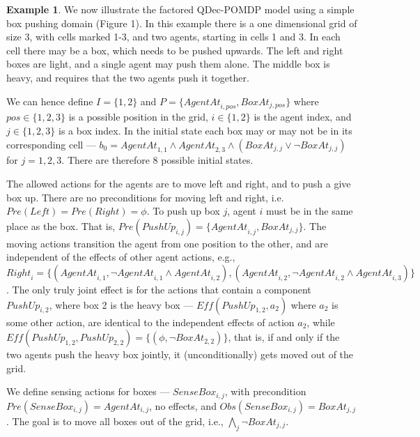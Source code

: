 \documentclass[letterpaper]{article}
\theoremstyle{definition}
\newtheorem{example}{Example}
\begin{document}
\begin{example}
\label{ex:BoxPushing}
We now illustrate the factored QDec-POMDP model using a simple box pushing domain (Figure 1).%
In this example there is a one dimensional grid of size 3, with cells marked 1-3, and two agents, starting in cells 1 and 3. In each cell there may be a box, which needs to be pushed upwards. The left and right boxes are light, and a single agent may push them alone. The middle box is heavy, and requires that the two agents push it together.

We can hence define $I=\{1,2\}$ and $P=\{\mathit{AgentAt}_{i,pos},\mathit{BoxAt}_{j,pos}\}$ where $pos \in \{1,2,3\}$ is a possible position in the grid, $i \in \{1,2\}$ is the agent index, and $j \in \{1,2,3\}$ is a box index. In the initial state each box may or may not be in its corresponding cell --- $b_0=\mathit{AgentAt}_{1,1} \wedge \mathit{AgentAt}_{2,3} \wedge (BoxAt_{j,j} \vee \neg BoxAt_{j,j})$ for $j=1,2,3$. There are therefore 8 possible initial states.

The allowed actions for the agents are to move left and right, and to push a give box up. There are no preconditions for moving left and right, i.e. $\mathit{Pre(Left)}=\mathit{Pre(Right)}=\phi$. To push up box $j$, agent $i$ must be in the same place as the box. That is, $\mathit{Pre(PushUp_{i,j})}=\{\mathit{AgentAt}_{i,j},\mathit{BoxAt}_{j,j}\}$. The moving actions transition the agent from one position to the other, and are independent of the effects of other agent actions, e.g., $\mathit{Right}_{i}=\{(\mathit{AgentAt}_{i,1},\neg \mathit{AgentAt}_{i,1} \wedge \mathit{AgentAt}_{i,2}),(\mathit{AgentAt}_{i,2},\neg \mathit{AgentAt}_{i,2} \wedge \mathit{AgentAt}_{i,3})\}$. The only truly joint effect is for the actions that contain a component $\mathit{PushUp}_{i,2}$, where box 2 is the heavy box --- $\mathit{Eff}(\mathit{PushUp}_{1,2},a_2)$ where $a_2$ is some other action, are identical to the independent effects of action $a_2$, while $\mathit{Eff}(\mathit{PushUp}_{1,2},\mathit{PushUp}_{2,2})=\{(\phi,\neg BoxAt_{2,2})\}$, that is, if and only if the two agents push the heavy box jointly, it (unconditionally) gets moved out of the grid.

We define sensing actions for boxes --- $\mathit{SenseBox_{i,j}}$, with precondition $\mathit{Pre(SenseBox_{i,j})}=AgentAt_{i,j}$, no effects, and $\mathit{Obs(SenseBox_{i,j})}=BoxAt_{j,j}$.
The goal is to move all boxes out of the grid, i.e., $\bigwedge_j \neg BoxAt_{j,j}$.

\end{example}
\end{document}
